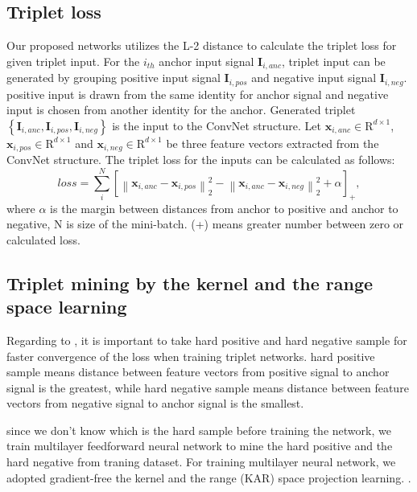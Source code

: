 \documentclass[runningheads]{llncs}
\begin{document}
\subsection{Triplet loss}

Our proposed networks utilizes the L-2 distance to calculate the triplet loss for given triplet input. For the $i_{th}$ anchor input signal $\mathbf{I}_{i,anc}$, triplet input can be generated by grouping positive input signal $\mathbf{I}_{i,pos}$ and negative input signal $\mathbf{I}_{i,neg}$.
positive input is drawn from the same identity for anchor signal and negative input is chosen from another identity for the anchor.
Generated triplet $\left\{\mathbf{I}_{i,anc},\mathbf{I}_{i,pos},\mathbf{I}_{i,neg}\right\}$ is the input to the ConvNet structure.
Let $\mathbf{x}_{i,anc}\in{\mathrm{R}}^{d\times1}$, $\mathbf{x}_{i,pos}\in{\mathrm{R}}^{d\times1}$ and $\mathbf{x}_{i,neg}\in{\mathrm{R}}^{d\times1}$ be three feature vectors extracted from the ConvNet structure. The triplet loss for the inputs can be calculated as follows:
\begin{equation}
loss = \sum_i^N { \left[ {\left\| {{\mathbf{x}_{i,anc}} - {\mathbf{x}_{i,pos}}} \right\|_2^2} -
{\left\| {{\mathbf{x}_{i,anc}} - {\mathbf{x}_{i,neg}}} \right\|_2^2}  + \alpha \right]_+},
\end{equation} 
where $\alpha$ is the margin between distances from anchor to positive and anchor to negative, N is size of the mini-batch. (+) means greater number between zero or calculated loss.


\subsection{Triplet mining by the kernel and the range space learning}

Regarding to \cite{schroff2015facenet}, it is important to take hard positive and hard negative sample for faster convergence of the loss when training triplet networks.
hard positive sample means distance between feature vectors from positive signal to anchor signal is the greatest, while hard negative sample means distance between feature vectors from negative signal to anchor signal is the smallest.

since we don't know which is the hard sample before training the network, we train multilayer feedforward neural network to mine the hard positive and the hard negative from traning dataset.
For training multilayer neural network, we adopted gradient-free the kernel and the range (KAR) space projection learning. \cite{toh2018learning,toh2018gradient}.
\end{document}
